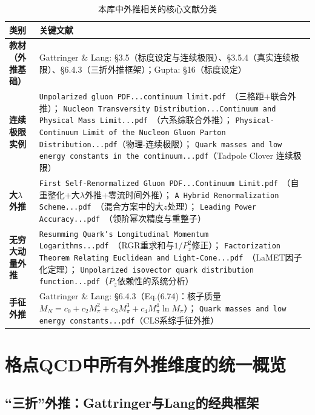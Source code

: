 \documentclass[12pt,a4paper]{ctexart}
\theoremstyle{definition}
\begin{document}
\begin{table}[H]
\centering
\caption{本库中外推相关的核心文献分类}
\label{tab:ext_papers}
\small
\begin{tabular}{lp{9cm}}
\toprule
类别 & 关键文献 \\
\midrule
\textbf{教材（外推基础）} &
Gattringer \& Lang: §3.5（标度设定与连续极限）、§3.5.4（真实连续极限）、§6.4.3（三折外推框架）；Gupta: §16（标度设定）\\
\textbf{连续极限实例} &
\texttt{Unpolarized gluon PDF...continuum limit.pdf}~\cite{Chen2025gluon}（三格距+联合外推）；
\texttt{Nucleon Transversity Distribution...Continuum and Physical Mass Limit...pdf}~\cite{NucleonTransversity2024}（六系综联合外推）；
\texttt{Physical-Continuum Limit of the Nucleon Gluon Parton Distribution...pdf}（物理-连续极限）；
\texttt{Quark masses and low energy constants in the continuum...pdf}（Tadpole Clover 连续极限）\\
\textbf{大$\lambda$外推} &
\texttt{First Self-Renormalized Gluon PDF...Continuum Limit.pdf}~\cite{FirstSelfRenormGluon2024}（自重整化+大$\lambda$外推+零流时间外推）；
\texttt{A Hybrid Renormalization Scheme...pdf}~\cite{Ji2021hybrid}（混合方案中的大$z$处理）；
\texttt{Leading Power Accuracy...pdf}~\cite{Zhang2023leadingPower}（领阶幂次精度与重整子）\\
\textbf{无穷大动量外推} &
\texttt{Resumming Quark's Longitudinal Momentum Logarithms...pdf}~\cite{Su2023RGR}（RGR重求和与$1/P_z^2$修正）；
\texttt{Factorization Theorem Relating Euclidean and Light-Cone...pdf}~\cite{Izubuchi2018}（LaMET因子化定理）；
\texttt{Unpolarized isovector quark distribution function...pdf}（$P_z$依赖性的系统分析）\\
\textbf{手征外推} &
Gattringer \& Lang: §6.4.3（Eq.(6.74)：核子质量$M_N = c_0 + c_2 M_\pi^2 + c_3 M_\pi^3 + c_4 M_\pi^4 \ln M_\pi$）；
\texttt{Quark masses and low energy constants...pdf}（CLS系综手征外推）\\
\bottomrule
\end{tabular}
\end{table}

\section{格点QCD中所有外推维度的统一概览}

\subsection{``三折''外推：Gattringer与Lang的经典框架}
\end{document}
